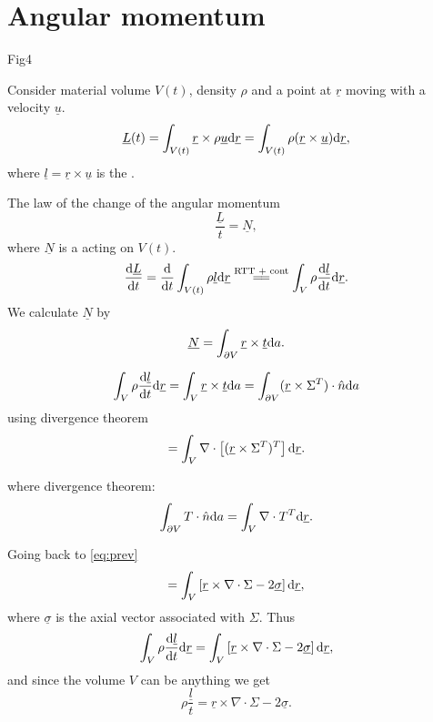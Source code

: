 \documentclass[11pt,oneside]{book}
\renewcommand{\vec}[1]{\underline{#1}}
\theoremstyle{definition} %
\theoremstyle{plain} %
\theoremstyle{remark} %
\theoremstyle{underline}
\begin{document}
  \section{Angular momentum}
  Fig4

  Consider material volume $V(t)$, density $\rho$ and a point at $\vec r$ moving with a velocity $\vec u$.
  \begin{displaymath}
    \vec L (t) = \int_{V(t)}\vec r \times \rho \vec u \d \vec r
    = \int_{V(t)} \rho (\vec r \times \vec u) \d \vec r,
  \end{displaymath}
  where $\vec l = \vec r \times \vec u $ is the .

  The law of the change of the angular momentum
  \begin{displaymath}
    \dfrac{ \vec L }{t} = \vec N,
  \end{displaymath}
  where $\vec N$ is a  acting on $V(t)$.
  \begin{displaymath}
    \dfrac{\vec L}{t} = \dfrac{}{t} \int_{V(t)} \rho \vec l \d \vec r \os{\tm{RTT + cont}}{=\joinrel=} \int_V \rho \dfrac{\vec l}{t} \d \vec r.
  \end{displaymath}
  We calculate $\vec N$ by
  \begin{displaymath}
    \vec N = \int_{\partial V} \vec r \times\vec t \d a.
  \end{displaymath}

  \begin{displaymath}
    \int_V \rho \dfrac{\vec l}{t} \d \vec r = \int_V \vec r \times \vec t \d a 
    = \int_{\partial V} (\vec r \times \Sigma^T) \cdot \hat n \d a 
  \end{displaymath}
  using divergence theorem
  \begin{equation}
    = \int_V \nabla \cdot \left[ ( \vec r \times \Sigma^T)^T \right] \d \vec r.
    \label{eq:prev}
  \end{equation}

  where divergence theorem:
  \begin{displaymath}
    \int_{\partial V} T \cdot \hat n \d a = \int_V \nabla \cdot T^T  \d \vec r.
  \end{displaymath}

  Going back to \ref{eq:prev}
  \begin{displaymath}
     = \int_V \left[ \vec r \times \nabla \cdot \Sigma - 2 \vec \sigma \right] \d \vec r,
  \end{displaymath}
  where $\vec \sigma $ is the axial vector associated with $\Sigma$.
  Thus
  \begin{displaymath}
    \int_V \rho \dfrac{ \vec l}{t} \d \vec r = \int_V \left[ \vec r \times \nabla \cdot \Sigma - 2 \vec \sigma \right] \d \vec r ,
  \end{displaymath}
  and since the volume $V$ can be anything we get
  \begin{equation}
    \rho \dfrac{ \vec l }{t} = \vec r \times \nabla \cdot \Sigma - 2 \vec \sigma.
    \label{eq:2.2}
  \end{equation}
\end{document}
